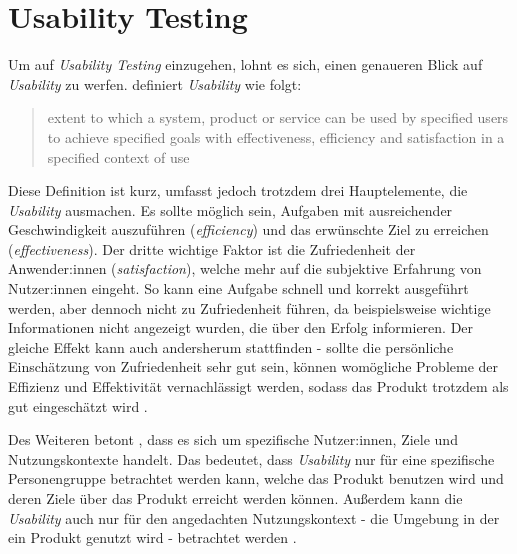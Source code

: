 \section{Usability Testing}
\label{sec:usability}

Um auf \textit{Usability Testing} einzugehen, lohnt es sich, einen genaueren Blick auf \textit{Usability} zu werfen.  definiert \textit{Usability} wie folgt:
\begin{quote}
  extent to which a system, product or service can be used by specified users to achieve specified goals with effectiveness, efficiency and satisfaction in a specified context of use
  \hspace*{\fill{}}
\end{quote}
Diese Definition ist kurz, umfasst jedoch trotzdem drei Hauptelemente, die \textit{Usability} ausmachen. Es sollte möglich sein, Aufgaben mit ausreichender Geschwindigkeit auszuführen (\textit{efficiency}) und das erwünschte Ziel zu erreichen (\textit{effectiveness}). Der dritte wichtige Faktor ist die Zufriedenheit der Anwender:innen (\textit{satisfaction}), welche mehr auf die subjektive Erfahrung von Nutzer:innen eingeht. So kann eine Aufgabe schnell und korrekt ausgeführt werden, aber dennoch nicht zu Zufriedenheit führen, da beispielsweise wichtige Informationen nicht angezeigt wurden, die über den Erfolg informieren. Der gleiche Effekt kann auch andersherum stattfinden - sollte die persönliche Einschätzung von Zufriedenheit sehr gut sein, können womögliche Probleme der Effizienz und Effektivität vernachlässigt werden, sodass das Produkt trotzdem als gut eingeschätzt wird \parencite{barnumUsabilityTesting2021}.

Des Weiteren betont \citeauthor{barnumUsabilityTesting2021}, dass es sich um spezifische Nutzer:innen, Ziele und Nutzungskontexte handelt. Das bedeutet, dass \textit{Usability} nur für eine spezifische Personengruppe betrachtet werden kann, welche das Produkt benutzen wird und deren Ziele über das Produkt erreicht werden können. Außerdem kann die \textit{Usability} auch nur für den angedachten Nutzungskontext - die Umgebung in der ein Produkt genutzt wird - betrachtet werden \parencite{barnumUsabilityTesting2021}.


